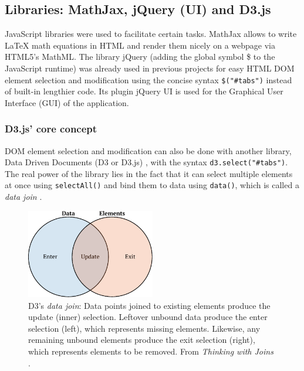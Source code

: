 \subsection{Libraries: MathJax, jQuery (UI) and D3.js}\label{sec:libraries}%
JavaScript libraries were used to facilitate certain tasks. MathJax allows to write \LaTeX{} math equations in HTML and render them nicely on a webpage via HTML5's MathML. The library jQuery (adding the global symbol \$ to the JavaScript runtime) was already used in previous projects for easy HTML DOM element selection and modification using the concise syntax \texttt{\$("\#tabs")} instead of built-in lengthier code. Its plugin jQuery UI is used for the Graphical User Interface (GUI) of the application.

\subsubsection{D3.js' core concept}\label{sec:dthree}
DOM element selection and modification can also be done with another library, Data Driven Documents (D3 or D3.js) \cite{bostock2011d3}, with the syntax \texttt{d3.select("\#tabs")}. The real power of the library lies in the fact that it can select multiple elements at once using \texttt{selectAll()} and bind them to data using \texttt{data()}, which is called a \textit{data join} .
\begin{figure}[htb!]
    \centering
	\includegraphics[width=0.5\textwidth]{fig/join}
	\caption{D3's \textit{data join}: Data points joined to existing elements produce the update (inner) selection. Leftover unbound data produce the enter selection (left), which represents missing elements. Likewise, any remaining unbound elements produce the exit selection (right), which represents elements to be removed. From \textit{Thinking with Joins} \cite{bostock2012join}.}
	\label{fig:join}
\end{figure}
